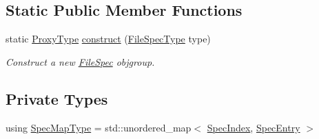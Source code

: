 \subsection*{Static Public Member Functions}
\begin{DoxyCompactItemize}
\item 
static \hyperlink{structvt_1_1utils_1_1file__spec_1_1_file_spec_ac4ad61ed146069ab671ec1bf909ebded}{Proxy\+Type} \hyperlink{structvt_1_1utils_1_1file__spec_1_1_file_spec_a918b12138f66bca9fbc82d02e3c6ef58}{construct} (\hyperlink{namespacevt_1_1utils_1_1file__spec_adc8912eb2949ca15d0f29afc0342f71e}{File\+Spec\+Type} type)
\begin{DoxyCompactList}\small\item\em Construct a new {\ttfamily \hyperlink{structvt_1_1utils_1_1file__spec_1_1_file_spec}{File\+Spec}} objgroup. \end{DoxyCompactList}\end{DoxyCompactItemize}
\subsection*{Private Types}
\begin{DoxyCompactItemize}
\item 
using \hyperlink{structvt_1_1utils_1_1file__spec_1_1_file_spec_a368a4ab8bf689e0b533abac71ae9393b}{Spec\+Map\+Type} = std\+::unordered\+\_\+map$<$ \hyperlink{structvt_1_1utils_1_1file__spec_1_1_file_spec_a3817fca09dbe932e0f6ba5729f1965ba}{Spec\+Index}, \hyperlink{structvt_1_1utils_1_1file__spec_1_1_file_spec_1_1_spec_entry}{Spec\+Entry} $>$
\end{DoxyCompactItemize}
